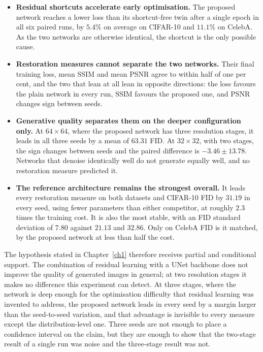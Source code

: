 \begin{itemize}
    \item \textbf{Residual shortcuts accelerate early optimisation.} The proposed network reaches a
    lower loss than its shortcut-free twin after a single epoch in all six paired runs, by $5.4\%$
    on average on CIFAR-10 and $11.1\%$ on CelebA. As the two networks are otherwise identical, the
    shortcut is the only possible cause.

    \item \textbf{Restoration measures cannot separate the two networks.} Their final training loss,
    mean SSIM and mean PSNR agree to within half of one per cent, and the two that lean at all lean
    in opposite directions: the loss favours the plain network in every run, SSIM favours the
    proposed one, and PSNR changes sign between seeds.

    \item \textbf{Generative quality separates them on the deeper configuration only.} At
    $64 \times 64$, where the proposed network has three resolution stages, it leads in all three
    seeds by a mean of $63.31$ FID. At $32 \times 32$, with two stages, the sign changes between
    seeds and the paired difference is $-3.46 \pm 13.78$. Networks that denoise identically well do
    not generate equally well, and no restoration measure predicted it.

    \item \textbf{The reference architecture remains the strongest overall.} It leads every
    restoration measure on both datasets and CIFAR-10 FID by $31.19$ in every seed, using fewer
    parameters than either competitor, at roughly $2.3$ times the training cost. It is also the most
    stable, with an FID standard deviation of $7.80$ against $21.13$ and $32.86$. Only on CelebA FID
    is it matched, by the proposed network at less than half the cost.
\end{itemize}

The hypothesis stated in Chapter~\ref{ch1} therefore receives partial and conditional support. The
combination of residual learning with a UNet backbone does not improve the quality of generated
images in general; at two resolution stages it makes no difference this experiment can detect. At
three stages, where the network is deep enough for the optimisation difficulty that residual
learning was invented to address, the proposed network leads in every seed by a margin larger than
the seed-to-seed variation, and that advantage is invisible to every measure except the
distribution-level one. Three seeds are not enough to place a confidence interval on the claim, but
they are enough to show that the two-stage result of a single run was noise and the three-stage
result was not.
